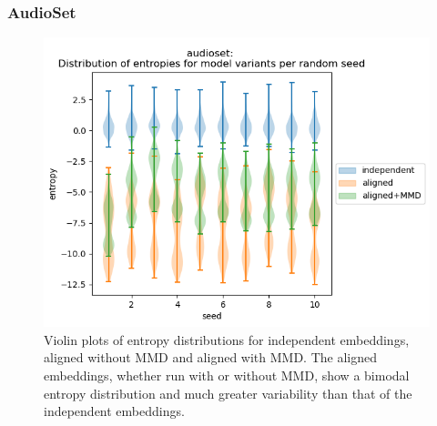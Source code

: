 \subsubsection{AudioSet}



\begin{figure}[H]
    \centering
    \includegraphics[width=\textwidth]{images/results/audioset_entropies_violin.png}
    \caption{
        Violin plots of entropy distributions for independent embeddings, aligned without MMD and aligned with MMD. The aligned embeddings, whether run with or without MMD, show a bimodal entropy distribution and much greater variability than that of the independent embeddings.  
    }
\end{figure}

